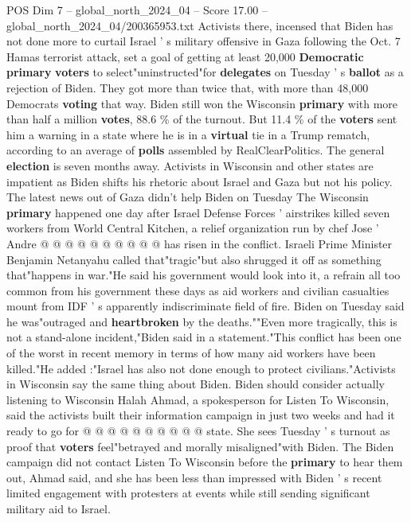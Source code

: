 \begin{textsample}{POS Dim 7 – global\_north\_2024\_04 – Score 17.00 – global\_north\_2024\_04/200365953.txt}  \label{ex:f7_pos_061}
Activists there, incensed that Biden has not done more to curtail Israel ' s military offensive in Gaza following the Oct. 7 Hamas terrorist attack, set a goal of getting at least 20,000 \textbf{Democratic} \textbf{primary} \textbf{voters} to select"uninstructed"for \textbf{delegates} on Tuesday ' s \textbf{ballot} as a rejection of Biden.
They got more than twice that, with more than 48,000 Democrats \textbf{voting} that way.
Biden still won the Wisconsin \textbf{primary} with more than half a million \textbf{votes}, 88.6 \% of the turnout.
But 11.4 \% of the \textbf{voters} sent him a warning in a state where he is in a \textbf{virtual} tie in a Trump rematch, according to an average of \textbf{polls} assembled by RealClearPolitics.
The general \textbf{election} is seven months away.
Activists in Wisconsin and other states are impatient as Biden shifts his rhetoric about Israel and Gaza but not his policy.
The latest news out of Gaza didn't help Biden on Tuesday The Wisconsin \textbf{primary} happened one day after Israel Defense Forces ' airstrikes killed seven workers from World Central Kitchen, a relief organization run by chef Jose ' Andre @ @ @ @ @ @ @ @ @ @ has risen in the conflict.
Israeli Prime Minister Benjamin Netanyahu called that"tragic"but also shrugged it off as something that"happens in war."He said his government would look into it, a refrain all too common from his government these days as aid workers and civilian casualties mount from IDF ' s apparently indiscriminate field of fire.
Biden on Tuesday said he was"outraged and \textbf{heartbroken} by the deaths.""Even more tragically, this is not a stand-alone incident,"Biden said in a statement."This conflict has been one of the worst in recent memory in terms of how many aid workers have been killed."He added :"Israel has also not done enough to protect civilians."Activists in Wisconsin say the same thing about Biden.
Biden should consider actually listening to Wisconsin Halah Ahmad, a spokesperson for Listen To Wisconsin, said the activists built their information campaign in just two weeks and had it ready to go for @ @ @ @ @ @ @ @ @ @ state.
She sees Tuesday ' s turnout as proof that \textbf{voters} feel"betrayed and morally misaligned"with Biden.
The Biden campaign did not contact Listen To Wisconsin before the \textbf{primary} to hear them out, Ahmad said, and she has been less than impressed with Biden ' s recent limited engagement with protesters at events while still sending significant military aid to Israel.

\end{textsample}
